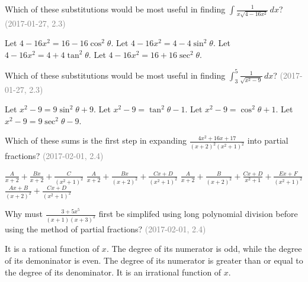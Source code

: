 \documentclass[12pt]{exam}
\newcommand{\questionDate}[1]{\textcolor{gray}{(#1)}}
\newcommand{\<}{\langle}
\renewcommand{\>}{\rangle}
\begin{document}
\begin{questions}
  \question
  Which of these substitutions would be most useful in finding
  \(\int\frac{1}{x\sqrt{4-16x^2}}\,dx\)?
  \questionDate{2017-01-27, 2.3}
  \begin{choices}
    \choice Let \(4-16x^2=16-16\cos^2\theta\).
    \CorrectChoice Let \(4-16x^2=4-4\sin^2\theta\).
    \choice Let \(4-16x^2=4+4\tan^2\theta\).
    \choice Let \(4-16x^2=16+16\sec^2\theta\).
  \end{choices}

  \question
  Which of these substitutions would be most useful in finding
  \(\int_3^5\frac{1}{\sqrt{x^2-9}}\,dx\)?
  \questionDate{2017-01-27, 2.3}
  \begin{choices}
    \choice Let \(x^2-9=9\sin^2\theta+9\).
    \choice Let \(x^2-9=\tan^2\theta-1\).
    \choice Let \(x^2-9=\cos^2\theta+1\).
    \CorrectChoice Let \(x^2-9=9\sec^2\theta-9\).
  \end{choices}







  \newpage

  \question
  Which of these sums is the first step in expanding
  \(\frac{4x^2+16x+17}{(x+2)^2(x^2+1)^2}\) into partial fractions?
  \questionDate{2017-02-01, 2.4}
  \begin{choices}
    \choice \(\frac{A}{x+2}+\frac{Bx}{x+2}+\frac{C}{(x^2+1)^2}\)
    \choice \(\frac{A}{x+2}+\frac{Bx}{(x+2)^2}+\frac{Cx+D}{(x^2+1)^2}\)
    \CorrectChoice \(\frac{A}{x+2}+\frac{B}{(x+2)^2}+
      \frac{Cx+D}{x^2+1}+\frac{Ex+F}{(x^2+1)^2}\)
    \choice \(\frac{Ax+B}{(x+2)^2}+\frac{Cx+D}{(x^2+1)^2}\)
  \end{choices}

  \question
  Why must \(\frac{3+5x^5}{(x+1)(x+3)^2}\) first be simplifed using
  long polynomial division before using the method of partial fractions?
  \questionDate{2017-02-01, 2.4}
  \begin{choices}
    \choice It is a rational function of \(x\).
    \choice The degree of its numerator is odd, while the degree of its
      demoninator is even.
    \CorrectChoice The degree of its numerator is greater than or equal to
      the degree of its denominator.
    \choice It is an irrational function of \(x\).
  \end{choices}







  \newpage


\end{questions}
\end{document}
